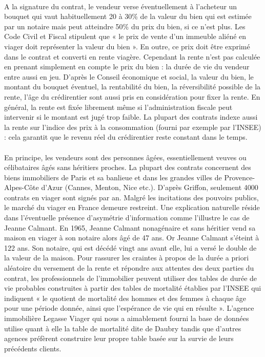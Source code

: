 \documentclass[12pt,a4paper]{article}
\begin{document}
\paragraph{}
A la signature du contrat, le vendeur verse éventuellement à l’acheteur un bouquet qui vaut habituellement 20 à 30\% de la valeur du bien qui est estimée par un notaire mais peut atteindre 50\% du prix du bien, si ce n’est plus. Les Code Civil et Fiscal stipulent que « le prix de vente d’un immeuble aliéné en viager doit représenter la valeur du bien ». En outre, ce prix doit être exprimé dans le contrat et converti en rente viagère. Cependant la rente n’est pas calculée en prenant simplement en compte le prix du bien : la durée de vie du vendeur entre aussi en jeu. D’après le Conseil économique et social, la valeur du bien, le montant du bouquet éventuel, la rentabilité du bien, la réversibilité possible de la rente, l’âge du crédirentier sont aussi pris en considération pour fixer la rente. En général, la rente est fixée librement même si l’administration fiscale peut intervenir si le montant est jugé trop faible. La plupart des contrats indexe aussi la rente sur l’indice des prix à la consommation (fourni par exemple par l’INSEE) : cela garantit que le revenu réel du crédirentier reste constant dans le temps.
\paragraph{}
 En principe, les vendeurs sont des personnes âgées, essentiellement veuves ou célibataires âgés sans héritiers proches. La plupart des contrats concernent des biens immobiliers de Paris et sa banlieue et dans les grandes villes de Provence-Alpes-Côte d’Azur (Cannes, Menton, Nice etc.). D’après Griffon, seulement 4000 contrats en viager sont signés par an. Malgré les incitations des pouvoirs publics, le marché du viager en France demeure restreint. Une explication naturelle réside dans l’éventuelle présence d’asymétrie d’information comme l’illustre le cas de Jeanne Calmant. En 1965, Jeanne Calmant nonagénaire et sans héritier vend sa maison en viager à son notaire alors âgé de 47 ans. Or Jeanne Calmant s’éteint à 122 ans. Son notaire, qui est décédé vingt ans avant elle, lui a versé le double de la valeur de la maison. Pour rassurer les craintes à propos de la durée a priori aléatoire du versement de la rente et répondre aux attentes des deux parties du contrat, les professionnels de l’immobilier peuvent utiliser des tables de durée de vie probables construites à partir des  tables de mortalité  établies par l’INSEE qui indiquent  « le quotient de mortalité des hommes et des femmes à chaque âge pour une période donnée, ainsi que l’espérance de vie qui en résulte ». L’agence immobilière Legasse Viager qui nous a aimablement fourni la base de données utilise quant à elle la table de mortalité dite de Daubry tandis que d’autres agences préfèrent construire leur propre table basée sur la survie de leurs précédents clients.
\end{document}
